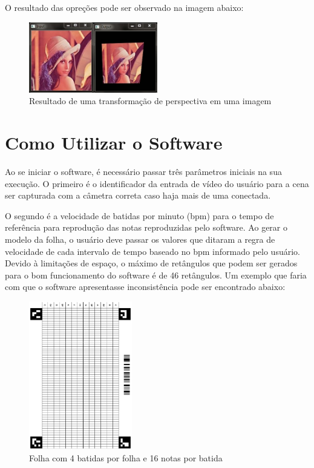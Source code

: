 \documentclass[12pt]{report}
\begin{document}
O resultado das opreções pode ser observado na imagem abaixo:

\begin{figure}[H]
  \centering
    \includegraphics[width=0.5\textwidth]{imagens/Perspective_Transform.JPG}
    \caption{Resultado de uma transformação de perspectiva em uma imagem}
  \label{fig:perspectiva}
\end{figure}

\chapter{Como Utilizar o Software}
\label{cha:cha6}

Ao se iniciar o software, é necessário passar três parâmetros iniciais na sua execução. O primeiro é o identificador da entrada de vídeo do usuário para a cena ser capturada com a câmetra correta caso haja mais de uma conectada.

O segundo é a velocidade de batidas por minuto (bpm) para o tempo de referência para reprodução das notas reproduzidas pelo software. Ao gerar o modelo da folha, o usuário deve passar os valores que ditaram a regra de velocidade de cada intervalo de tempo baseado no bpm informado pelo usuário. Devido à limitações de espaço, o máximo de retângulos que podem ser gerados para o bom funcionamento do software é de 46 retângulos. Um exemplo que faria com que o software apresentasse inconsistência pode ser encontrado abaixo:

\begin{figure}[H]
  \centering
    \includegraphics[angle=90,origin=c,width=0.4\textwidth]{imagens/416.png}
    \caption{Folha com 4 batidas por folha e 16 notas por batida}
  \label{fig:416}
\end{figure}
\end{document}
